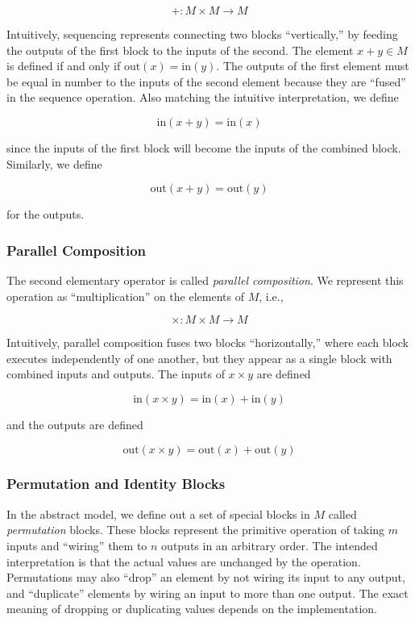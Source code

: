 \[
+ : M \times M \to M
\]

Intuitively, sequencing represents connecting two blocks ``vertically,'' by feeding the outputs of the first block to the inputs of the second. The element $x+y \in M$ is defined if and only if $\mbox{out}(x) = \mbox{in}(y)$. The outputs of the first element must be equal in number to the inputs of the second element because they are ``fused'' in the sequence operation. Also matching the intuitive interpretation, we define 

\[
\mbox{in}(x+y) = \mbox{in}(x)
\]

since the inputs of the first block will become the inputs of the combined block. Similarly, we define

\[
\mbox{out}(x+y) = \mbox{out}(y)
\]

for the outputs.

\subsubsection{Parallel Composition}

The second elementary operator is called \emph{parallel composition}. We represent this operation as ``multiplication'' on the elements of $M$, i.e.,

\[
\times : M \times M \to M
\]

Intuitively, parallel composition fuses two blocks ``horizontally,'' where each block executes independently of one another, but they appear as a single block with combined inputs and outputs. The inputs of $x\times y$ are defined

\[
\mbox{in} (x \times y) = \mbox{in}(x)+\mbox{in}(y)
\]

and the outputs are defined

\[
\mbox{out}(x \times y) = \mbox{out}(x) + \mbox{out}(y)
\]

\subsubsection{Permutation and Identity Blocks}
\label{sec:code-gen:special}

In the abstract model, we define out a set of special blocks in $M$ called \emph{permutation} blocks. These blocks represent the primitive operation of taking $m$ inputs and ``wiring'' them to $n$ outputs in an arbitrary order. The intended interpretation is that the actual values are unchanged by the operation. Permutations may also ``drop'' an element by not wiring its input to any output, and ``duplicate'' elements by wiring an input to more than one output. The exact meaning of dropping or duplicating values depends on the implementation.

